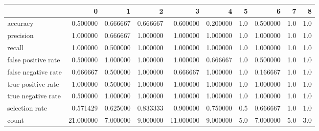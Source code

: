 \begin{tabular}{lrrrrrrrrr}
\toprule
{} &          0 &         1 &         2 &          3 &         4 &    5 &         6 &    7 &    8 \\
\midrule
accuracy            &   0.500000 &  0.666667 &  0.666667 &   0.600000 &  0.200000 &  1.0 &  0.500000 &  1.0 &  1.0 \\
precision           &   1.000000 &  0.666667 &  1.000000 &   1.000000 &  1.000000 &  1.0 &  1.000000 &  1.0 &  1.0 \\
recall              &   1.000000 &  0.500000 &  1.000000 &   1.000000 &  1.000000 &  1.0 &  1.000000 &  1.0 &  1.0 \\
false positive rate &   0.500000 &  1.000000 &  1.000000 &   1.000000 &  0.666667 &  1.0 &  0.500000 &  1.0 &  1.0 \\
false negative rate &   0.666667 &  0.500000 &  1.000000 &   0.666667 &  1.000000 &  1.0 &  0.166667 &  1.0 &  1.0 \\
true positive rate  &   1.000000 &  0.500000 &  1.000000 &   1.000000 &  1.000000 &  1.0 &  1.000000 &  1.0 &  1.0 \\
true negative rate  &   0.500000 &  1.000000 &  1.000000 &   1.000000 &  1.000000 &  1.0 &  1.000000 &  1.0 &  1.0 \\
selection rate      &   0.571429 &  0.625000 &  0.833333 &   0.900000 &  0.750000 &  0.5 &  0.666667 &  1.0 &  1.0 \\
count               &  21.000000 &  7.000000 &  9.000000 &  11.000000 &  9.000000 &  5.0 &  7.000000 &  5.0 &  3.0 \\
\bottomrule
\end{tabular}
